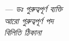 \BanglaDummyText

\BanglaDummyText

\begin{flushright}
	\textit{\small — ডঃ গুরুত্বপূর্ণ ব্যক্তি\\
		আরো গুরুত্বপূর্ণ পদ\\
		বিলিতি ঠিকানা}
\end{flushright}